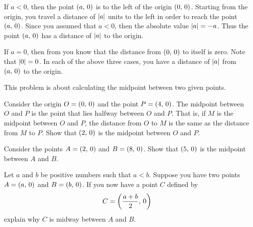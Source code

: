 \documentclass[a4paper,oneside,12pt]{article}
\begin{document}
\begin{problem}
{\begin{solution}
  If $a < 0$, then the point $\left\lparen{a},\, {0}\right\rparen$ is to the left of the
  origin $\left\lparen{0},\, {0}\right\rparen$.  Starting from the origin, you travel a
  distance of $\lvert a\rvert$ units to the left in order to reach
  the point $\left\lparen{a},\, {0}\right\rparen$.  Since you assumed that $a < 0$, then the
  absolute value $\lvert a\rvert = -a$.  Thus the point
  $\left\lparen{a},\, {0}\right\rparen$ has a distance of $\lvert a\rvert$ to the origin.

  If $a = 0$, then from
   you know that
  the distance from $\left\lparen{0},\, {0}\right\rparen$ to itself is zero.  Note that
  $\lvert0\rvert = 0$.  In each of the above three cases, you have
  a distance of $\lvert a\rvert$ from $\left\lparen{a},\, {0}\right\rparen$ to the
  origin.
  \end{solution}
}{}

\item This problem is about calculating the midpoint between two given
  points.
  \begin{packedenum}
  \item\label{subprob:midpoint_from_origin}
    Consider the origin $O = \left\lparen{0},\, {0}\right\rparen$ and the point
    $P = \left\lparen{4},\, {0}\right\rparen$.  The midpoint between $O$ and $P$ is the point
    that lies halfway between $O$ and $P$.  That is, if $M$ is the
    midpoint between $O$ and $P$, the distance from $O$ to $M$ is the
    same as the distance from $M$ to $P$.  Show that $\left\lparen{2},\, {0}\right\rparen$ is
    the midpoint between $O$ and $P$.

  \item\label{subprob:midpoint_not_from_origin}
    Consider the points $A = \left\lparen{2},\, {0}\right\rparen$ and $B = \left\lparen{8},\, {0}\right\rparen$.
    Show that $\left\lparen{5},\, {0}\right\rparen$ is the midpoint between $A$ and $B$.

  \item\label{subprob:midpoint_general_distinct_points}
    Let $a$ and $b$ be positive numbers such that $a < b$.  Suppose
    you have two points $A = \left\lparen{a},\, {0}\right\rparen$ and $B = \left\lparen{b},\, {0}\right\rparen$.  If
    you now have a point $C$ defined by
    \[
    C
    =
    \left\lparen{
      \frac{a + b}{2}
    },\, {
      0
    }\right\rparen
    \]
    explain why $C$ is midway between $A$ and $B$.
  \end{packedenum}
\end{problem}
\end{document}
